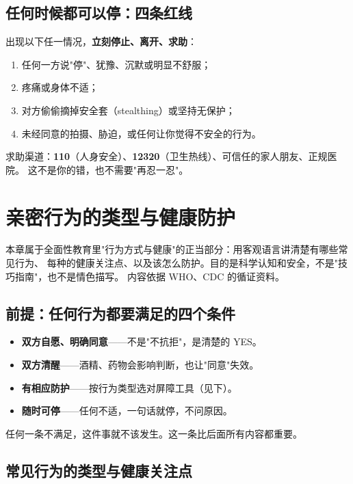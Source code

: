 \documentclass[12pt,UTF8,openany]{ctexbook}
\begin{document}
\section{任何时候都可以停：四条红线}

出现以下任一情况，\textbf{立刻停止、离开、求助}：

\begin{enumerate}[leftmargin=2em,itemsep=0.3em]
  \item 任何一方说"停"、犹豫、沉默或明显不舒服；
  \item 疼痛或身体不适；
  \item 对方偷偷摘掉安全套（stealthing）或坚持无保护；
  \item 未经同意的拍摄、胁迫，或任何让你觉得不安全的行为。
\end{enumerate}

求助渠道：\textbf{110}（人身安全）、\textbf{12320}（卫生热线）、可信任的家人朋友、正规医院。
这不是你的错，也不需要"再忍一忍"。

\chapter{亲密行为的类型与健康防护}
\label{chap:practices}

本章属于全面性教育里"行为方式与健康"的正当部分：用客观语言讲清楚有哪些常见行为、
每种的健康关注点、以及该怎么防护。目的是科学认知和安全，不是"技巧指南"，也不是情色描写。
内容依据 WHO、CDC 的循证资料。

\section{前提：任何行为都要满足的四个条件}

\begin{itemize}[leftmargin=2em]
  \item \textbf{双方自愿、明确同意}——不是"不抗拒"，是清楚的 YES。
  \item \textbf{双方清醒}——酒精、药物会影响判断，也让"同意"失效。
  \item \textbf{有相应防护}——按行为类型选对屏障工具（见下）。
  \item \textbf{随时可停}——任何不适，一句话就停，不问原因。
\end{itemize}

任何一条不满足，这件事就不该发生。这一条比后面所有内容都重要。

\section{常见行为的类型与健康关注点}
\end{document}
